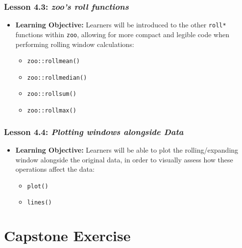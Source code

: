 \documentclass[
]{book}
\providecommand{\tightlist}{%
  \setlength{\itemsep}{0pt}\setlength{\parskip}{0pt}}
\begin{document}
\hypertarget{lesson-4.3-zoos-roll-functions}{%
\subsection*{\texorpdfstring{Lesson 4.3: \emph{zoo's roll functions}}{Lesson 4.3: zoo's roll functions}}\label{lesson-4.3-zoos-roll-functions}}

\begin{itemize}
\item
  \textbf{Learning Objective:} Learners will be introduced to the other \texttt{roll*} functions within \texttt{zoo}, allowing for more compact and legible code when performing rolling window calculations:

  \begin{itemize}
  \item
    \texttt{zoo::rollmean()}
  \item
    \texttt{zoo::rollmedian()}
  \item
    \texttt{zoo::rollsum()}
  \item
    \texttt{zoo::rollmax()}
  \end{itemize}
\end{itemize}

\hypertarget{lesson-4.4-plotting-windows-alongside-data}{%
\subsection*{\texorpdfstring{Lesson 4.4: \emph{Plotting windows alongside Data}}{Lesson 4.4: Plotting windows alongside Data}}\label{lesson-4.4-plotting-windows-alongside-data}}

\begin{itemize}
\tightlist
\item
  \textbf{Learning Objective:} Learners will be able to plot the rolling/expanding window alongside the original data, in order to visually assess how these operations affect the data:

  \begin{itemize}
  \tightlist
  \item
    \texttt{plot()}
  \item
    \texttt{lines()}
  \end{itemize}
\end{itemize}

\hypertarget{capstone-exercise}{%
\chapter{Capstone Exercise}\label{capstone-exercise}}
\end{document}
